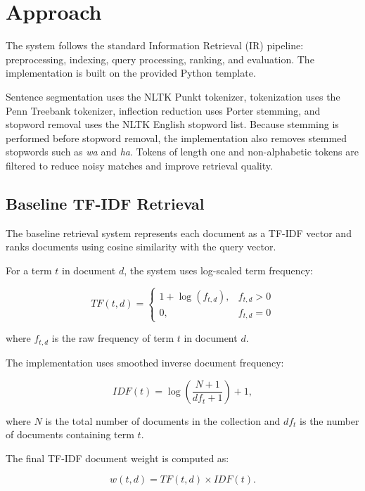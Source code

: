 \section{Approach}\label{sec:approach}

The system follows the standard Information Retrieval (IR) pipeline:
preprocessing, indexing, query processing, ranking, and evaluation. The
implementation is built on the provided Python template.

Sentence segmentation uses the NLTK Punkt tokenizer, tokenization uses the
Penn Treebank tokenizer, inflection reduction uses Porter stemming, and
stopword removal uses the NLTK English stopword list. Because stemming is
performed before stopword removal, the implementation also removes stemmed
stopwords such as \emph{wa} and \emph{ha}. Tokens of length one and
non-alphabetic tokens are filtered to reduce noisy matches and improve
retrieval quality.

\subsection{Baseline TF-IDF Retrieval}

The baseline retrieval system represents each document as a TF-IDF vector and
ranks documents using cosine similarity with the query vector.

For a term $t$ in document $d$, the system uses log-scaled term frequency:

\begin{equation}
TF(t,d)=
\begin{cases}
1+\log(f_{t,d}), & f_{t,d}>0 \\
0, & f_{t,d}=0
\end{cases}
\label{eq:tf}
\end{equation}

where $f_{t,d}$ is the raw frequency of term $t$ in document $d$.

The implementation uses smoothed inverse document frequency:

\begin{equation}
IDF(t)=
\log\left(
\frac{N+1}{df_t+1}
\right)+1,
\label{eq:idf}
\end{equation}

where $N$ is the total number of documents in the collection and $df_t$ is
the number of documents containing term $t$.

The final TF-IDF document weight is computed as:

\begin{equation}
w(t,d)=TF(t,d)\times IDF(t).
\label{eq:tfidf}
\end{equation}

